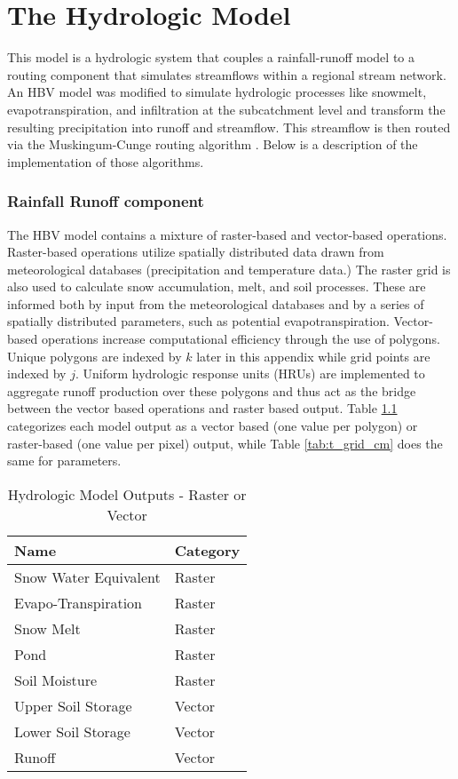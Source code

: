 \chapter{The Hydrologic Model}
\label{chap:daWUAPhydroengine}

This model is a hydrologic system that couples a rainfall-runoff model to a routing component that simulates streamflows within a regional stream network. An HBV model \cite{Bergstrom1992, Bergstrom1976} was modified to simulate hydrologic processes like snowmelt, evapotranspiration, and infiltration at the subcatchment level and transform the resulting precipitation into runoff and streamflow. This streamflow is then routed via the Muskingum-Cunge routing algorithm \cite{V.TChowD.RMaidment1988}. Below is a description of the implementation of those algorithms.


\subsection{Rainfall Runoff component}

The HBV model \cite{Bergstrom1992, Bergstrom1976} contains a mixture of raster-based and vector-based operations. Raster-based operations utilize spatially distributed data drawn from meteorological databases (precipitation and temperature data.)  The raster grid is also used to calculate snow accumulation, melt, and soil processes. These are informed both by input from the meteorological databases and by a series of spatially distributed parameters, such as potential evapotranspiration. Vector-based operations increase computational efficiency through the use of polygons. Unique polygons are indexed by $k$ later in this appendix while grid points are indexed by $j$. Uniform hydrologic response units (HRUs) are implemented to aggregate runoff production over these polygons and thus act as the bridge between the vector based operations and raster based output. Table \ref{tab:t_outputs_raster_or_vector} categorizes each model output as a vector based (one value per polygon) or raster-based (one value per pixel) output, while Table \ref{tab:t_grid_cm} does the same for parameters.


\begin{table}[]
\caption{Hydrologic Model Outputs - Raster or Vector} 
\begin{tabular}{ll}
Name & Category  \\ \hline
Snow Water Equivalent & Raster \\
Evapo-Transpiration & Raster \\
Snow Melt & Raster \\
Pond & Raster \\
Soil Moisture & Raster \\
Upper Soil Storage & Vector \\
Lower Soil Storage & Vector \\
Runoff & Vector \\
\end{tabular}
\label{tab:t_outputs_raster_or_vector}
\end{table}

